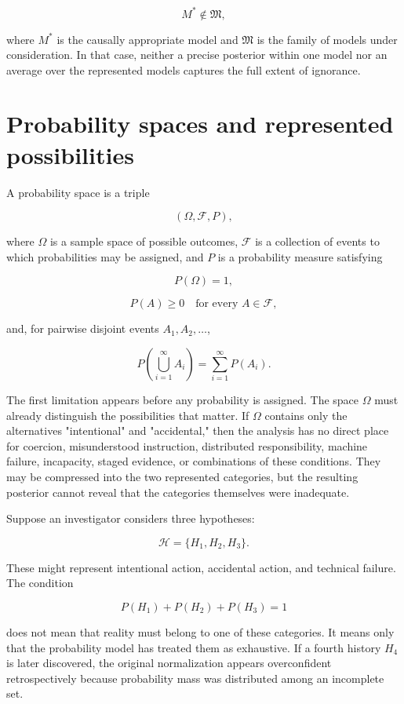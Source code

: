 \[
M^\ast\notin\mathfrak M,
\]

where \(M^\ast\) is the causally appropriate model and \(\mathfrak M\) is the family of models under consideration. In that case, neither a precise posterior within one model nor an average over the represented models captures the full extent of ignorance.

\section{Probability spaces and represented possibilities}
\label{sec:a2}

A probability space is a triple

\[
(\Omega,\mathcal F,P),
\]

where \(\Omega\) is a sample space of possible outcomes, \(\mathcal F\) is a collection of events to which probabilities may be assigned, and \(P\) is a probability measure satisfying

\[
P(\Omega)=1,
\]

\[
P(A)\geq 0
\quad\text{for every }A\in\mathcal F,
\]

and, for pairwise disjoint events \(A_1,A_2,\ldots\),

\[
P\left(\bigcup_{i=1}^{\infty}A_i\right)
=
\sum_{i=1}^{\infty}P(A_i).
\]

The first limitation appears before any probability is assigned. The space \(\Omega\) must already distinguish the possibilities that matter. If \(\Omega\) contains only the alternatives "intentional" and "accidental," then the analysis has no direct place for coercion, misunderstood instruction, distributed responsibility, machine failure, incapacity, staged evidence, or combinations of these conditions. They may be compressed into the two represented categories, but the resulting posterior cannot reveal that the categories themselves were inadequate.

Suppose an investigator considers three hypotheses:

\[
\mathcal H=\{H_1,H_2,H_3\}.
\]

These might represent intentional action, accidental action, and technical failure. The condition

\[
P(H_1)+P(H_2)+P(H_3)=1
\]

does not mean that reality must belong to one of these categories. It means only that the probability model has treated them as exhaustive. If a fourth history \(H_4\) is later discovered, the original normalization appears overconfident retrospectively because probability mass was distributed among an incomplete set.

